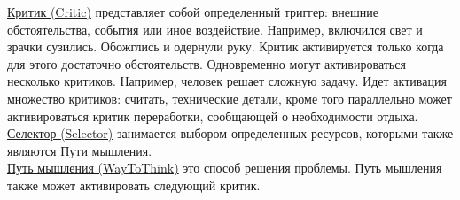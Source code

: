 \underline{Критик (Critic)} представляет собой определенный триггер: внешние обстоятельства, события или иное воздействие. Например, включился свет и зрачки сузились. Обожглись и одернули руку. Критик активируется только когда для этого достаточно обстоятельств. Одновременно могут активироваться несколько критиков. Например, человек решает сложную задачу. Идет активация множество критиков: считать, технические детали, кроме того параллельно может активироваться критик переработки, сообщающей о необходимости отдыха.\\
\underline{Селектор (Selector)} занимается выбором определенных ресурсов, которыми также являются Пути мышления. \\
\underline{Путь мышления (WayToThink)} это способ решения проблемы. Путь мышления также может активировать следующий критик. \\

